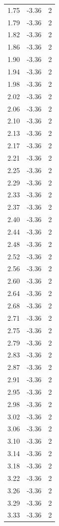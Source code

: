 \begin{longtable}{lrr}
  1.75 & -3.36 & 2 \\
  1.79 & -3.36 & 2 \\
  1.82 & -3.36 & 2 \\
  1.86 & -3.36 & 2 \\
  1.90 & -3.36 & 2 \\
  1.94 & -3.36 & 2 \\
  1.98 & -3.36 & 2 \\
  2.02 & -3.36 & 2 \\
  2.06 & -3.36 & 2 \\
  2.10 & -3.36 & 2 \\
  2.13 & -3.36 & 2 \\
  2.17 & -3.36 & 2 \\
  2.21 & -3.36 & 2 \\
  2.25 & -3.36 & 2 \\
  2.29 & -3.36 & 2 \\
  2.33 & -3.36 & 2 \\
  2.37 & -3.36 & 2 \\
  2.40 & -3.36 & 2 \\
  2.44 & -3.36 & 2 \\
  2.48 & -3.36 & 2 \\
  2.52 & -3.36 & 2 \\
  2.56 & -3.36 & 2 \\
  2.60 & -3.36 & 2 \\
  2.64 & -3.36 & 2 \\
  2.68 & -3.36 & 2 \\
  2.71 & -3.36 & 2 \\
  2.75 & -3.36 & 2 \\
  2.79 & -3.36 & 2 \\
  2.83 & -3.36 & 2 \\
  2.87 & -3.36 & 2 \\
  2.91 & -3.36 & 2 \\
  2.95 & -3.36 & 2 \\
  2.98 & -3.36 & 2 \\
  3.02 & -3.36 & 2 \\
  3.06 & -3.36 & 2 \\
  3.10 & -3.36 & 2 \\
  3.14 & -3.36 & 2 \\
  3.18 & -3.36 & 2 \\
  3.22 & -3.36 & 2 \\
  3.26 & -3.36 & 2 \\
  3.29 & -3.36 & 2 \\
  3.33 & -3.36 & 2 \\

\end{longtable}
